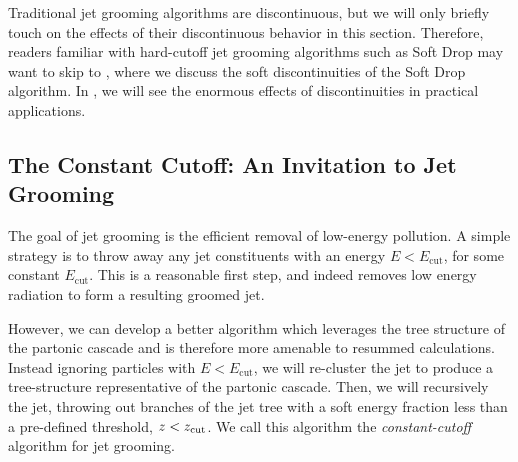 Traditional jet grooming algorithms are discontinuous, but we will only briefly touch on the effects of their discontinuous behavior in this section.
%
Therefore, readers familiar with hard-cutoff jet grooming algorithms such as Soft Drop may want to skip to , where we discuss the soft discontinuities of the Soft Drop algorithm.
%
In , we will see the enormous effects of discontinuities in practical applications.


\subsection{The Constant Cutoff: An Invitation to Jet Grooming}
\label{sec:constant-cutoff}

The goal of jet grooming is the efficient removal of low-energy pollution.
%
A simple strategy is to throw away any jet constituents with an energy \(E < E_\text{cut}\), for some constant \(E_\text{cut}\).
%
This is a reasonable first step, and indeed removes low energy radiation to form a resulting groomed jet.

However, we can develop a better algorithm which leverages the tree structure of the partonic cascade and is therefore more amenable to resummed calculations.
%
Instead ignoring particles with \(E < E_\text{cut}\), we will re-cluster the jet to produce a tree-structure representative of the partonic cascade.
%
Then, we will recursively  the jet, throwing out branches of the jet tree with a soft energy fraction less than a pre-defined threshold, \(z < z_{\rm cut}\).
%
We call this algorithm the \textit{\gls{constant-cutoff}} algorithm for jet grooming.


